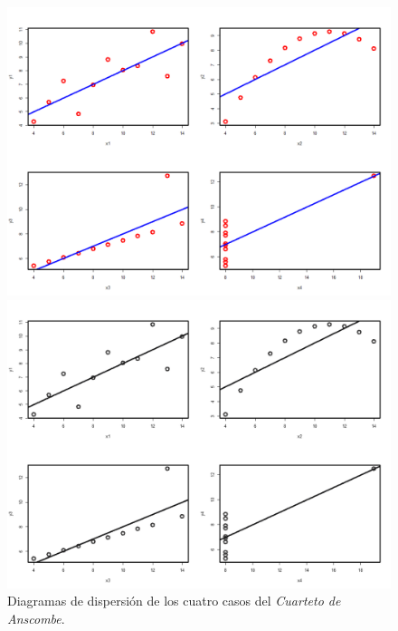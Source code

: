 \begin{figure}[tb]
\begin{center}
\begin{enColor}
\includegraphics[width=14cm]{../fig/Cap10-Anscombe.png}
\end{enColor}
\begin{bn}
\includegraphics[width=14cm]{../fig/Cap10-Anscombe-bn.png}
\end{bn}
\end{center}
\caption{Diagramas de dispersión de los cuatro casos del {\em Cuarteto de Anscombe}.}
\label{tut10:fig:CuartetoAnscombe}
\end{figure}

